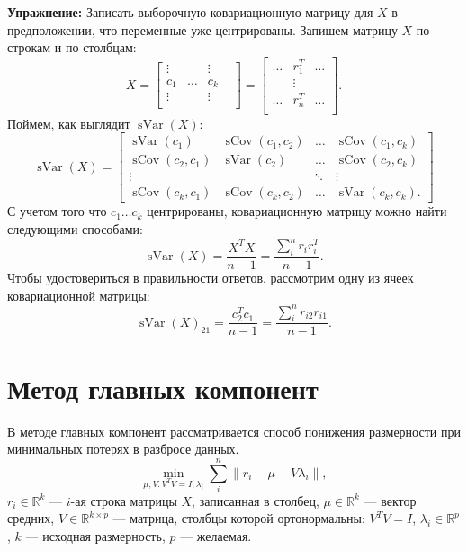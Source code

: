 \documentclass[12pt]{article} %
\theoremstyle{definition} %
\DeclareMathOperator{\sCov}{sCov}
\DeclareMathOperator{\sVar}{sVar}
\def \RR{\mathbb{R}}
\begin{document}
\textbf{Упражнение:}
Записать выборочную ковариационную матрицу для \(X\) в предположении, что переменные уже центрированы. Запишем матрицу \(X\) по строкам и по столбцам:
\[
X = \begin{bmatrix}
    \vdots &  & \vdots & \\
    c_1 & \dots & c_k \\
    \vdots &  & \vdots & \\
    \end{bmatrix}
    =
    \begin{bmatrix}
    \dots & r_{1}^T & \dots \\
    & \vdots & \\
    \dots & r_{n}^T & \dots \\
    \end{bmatrix}.
\]
Поймем, как выглядит \( \sVar(X) \):
\[
\sVar(X) = \begin{bmatrix}
\sVar(c_1) & \sCov(c_1, c_2) & \dots & \sCov(c_1, c_k) \\
\sCov(c_2, c_1) & \sVar(c_2) & \dots & \sCov(c_2, c_k) \\
\vdots & & \ddots & \vdots\\
\sCov(c_k, c_1) & \sCov(c_k, c_2) & \dots & \sVar(c_k, c_k).
\end{bmatrix}
\]
С учетом того что \( c_1 \dots c_k \) центрированы, ковариационную матрицу можно найти следующими способами:
\[ \sVar(X) = \frac{X^TX}{n-1} = \frac{\sum_i^n r_i r_i^T}{n-1}.\]
Чтобы удостовериться в правильности ответов, рассмотрим одну из ячеек ковариационной матрицы:
\[\sVar(X)_{21} = \frac{c_2^Tc_1}{n-1} = \frac{\sum_i^n r_{i2} r_{i1} }{n-1}. \]

\section{Метод главных компонент}
В методе главных компонент рассматривается способ понижения размерности при минимальных потерях в разбросе данных.
\[ \min_{\mu, V: V^TV=I, \lambda_i} \sum_{i}^n \left\|r_i - \mu - V\lambda_i \right\|, \]
\(r_i \in \RR^k\) — \(i\)-ая строка матрицы \(X\), записанная в столбец,
\(\mu \in \RR^k\) — вектор средних, \(V \in \RR^{k \times p}\)  —  матрица, столбцы которой ортонормальны: \( V^TV=I \), \( \lambda_i \in \RR^p\), \(k\)  —  исходная размерность, \(p\)  —  желаемая.
\end{document}
